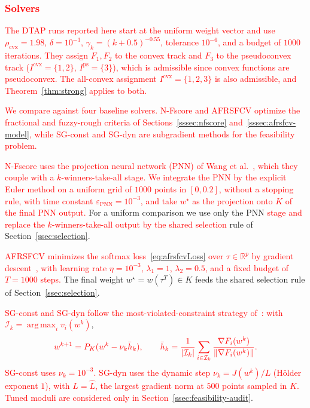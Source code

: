 \documentclass[]{interact}
\theoremstyle{plain}
\theoremstyle{definition}
\theoremstyle{remark}
\newcommand{\R}{\mathbb{R}}
\DeclareMathOperator*{\argmax}{arg\,max}
\newcommand{\cvx}{\mathrm{cvx}}
\newcommand{\ps}{\mathrm{ps}}
\begin{document}
\subsubsection{\textcolor{red}{Solvers}}\label{sssec:baselines}
\leavevmode\textcolor{red}{The DTAP runs reported here start at the uniform weight vector and use $\rho_{\cvx}=1.98$, $\delta=10^{-3}$, $\gamma_k=(k+0.5)^{-0.55}$, tolerance $10^{-6}$, and a budget of $1000$ iterations. They assign $F_1,F_2$ to the convex track and $F_3$ to the pseudoconvex track ($I^{\cvx}=\{1,2\}$, $I^{\ps}=\{3\}$), which is admissible since convex functions are pseudoconvex. The all-convex assignment $I^{\cvx}=\{1,2,3\}$ is also admissible, and Theorem~\ref{thm:strong} applies to both.}

\leavevmode\textcolor{red}{We compare against four baseline solvers. N-Fscore and AFRSFCV optimize the fractional and fuzzy-rough criteria of Sections~\ref{sssec:nfscore} and~\ref{sssec:afrsfcv-model}, while SG-const and SG-dyn are subgradient methods for the feasibility problem.}

\leavevmode\textcolor{red}{N-Fscore uses the projection neural network (PNN) of Wang et al.~\citep{wang2021fractional}, which they couple with a $k$-winners-take-all stage. We integrate the PNN by the explicit Euler method on a uniform grid of $1000$ points in $[0,0.2]$, without a stopping rule, with time constant $\varepsilon_{\mathrm{PNN}}=10^{-3}$, and take $w^\star$ as the projection onto $K$ of the final PNN output.} For a uniform comparison we use only the PNN \leavevmode\textcolor{red}{stage and replace the $k$-winners-take-all output by the shared selection} rule of Section~\ref{ssec:selection}.

\leavevmode\textcolor{red}{AFRSFCV minimizes the softmax loss~\eqref{eq:afrsfcvLoss} over $\tau\in\R^p$ by gradient descent~\citep{wang2026afrsfcv}, with learning rate $\eta=10^{-3}$, $\lambda_1=1$, $\lambda_2=0.5$, and a fixed budget of $T=1000$ steps.} The final weight $w^\star=w(\tau^T)\in K$ feeds the shared selection rule of Section~\ref{ssec:selection}.

\leavevmode\textcolor{red}{SG-const and SG-dyn follow the most-violated-constraint strategy of~\citep{hu2022quasi}: with $\mathcal I_k=\argmax_i v_i(w^k)$},
\[\textcolor{red}{
w^{k+1}=P_K(w^k-\nu_k\bar h_k),\qquad
\bar h_k=\frac1{|\mathcal I_k|}\sum_{i\in\mathcal I_k}\frac{\nabla F_i(w^k)}{\|\nabla F_i(w^k)\|}.
}\]
\leavevmode\textcolor{red}{SG-const uses $\nu_k=10^{-3}$. SG-dyn uses the dynamic step $\nu_k=J(w^k)/L$ (H\"older exponent $1$), with $L=\widehat L$, the largest gradient norm at $500$ points sampled in $K$. Tuned moduli are considered only in Section~\ref{ssec:feasibility-audit}}.
\end{document}
